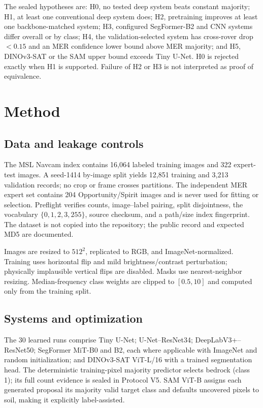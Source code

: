 \documentclass{article}
\begin{document}
The sealed hypotheses are: H0, no tested deep system beats constant majority; H1, at least one
conventional deep system does; H2, pretraining improves at least one backbone-matched system; H3,
configured SegFormer-B2 and CNN systems differ overall or by class; H4, the validation-selected
system has cross-rover drop $<0.15$ and an MER confidence lower bound above MER majority; and H5,
DINOv3-SAT or the SAM upper bound exceeds Tiny U-Net. H0 is rejected exactly when H1 is supported.
Failure of H2 or H3 is not interpreted as proof of equivalence.

\section{Method}

\subsection{Data and leakage controls}

The MSL Navcam index contains 16,064 labeled training images and 322 expert-test images. A
seed-1414 by-image split yields 12,851 training and 3,213 validation records; no crop or frame
crosses partitions. The independent MER expert set contains 204 Opportunity/Spirit images and is
never used for fitting or selection. Preflight verifies counts, image--label pairing, split
disjointness, the vocabulary $\{0,1,2,3,255\}$, source checksum, and a path/size index fingerprint.
The dataset is not copied into the repository; the public record and expected MD5 are documented.

Images are resized to $512^2$, replicated to RGB, and ImageNet-normalized. Training uses
horizontal flip and mild brightness/contrast perturbation; physically implausible vertical flips
are disabled. Masks use nearest-neighbor resizing. Median-frequency class weights are clipped to
$[0.5,10]$ and computed only from the training split.

\subsection{Systems and optimization}

The 30 learned runs comprise Tiny U-Net; U-Net--ResNet34; DeepLabV3+--ResNet50; SegFormer MiT-B0
and B2, each where applicable with ImageNet and random initialization; and DINOv3-SAT ViT-L/16
with a trained segmentation head. The deterministic training-pixel majority predictor selects
bedrock (class 1); its full count evidence is sealed in Protocol V5. SAM ViT-B assigns each
generated proposal its majority valid target class and defaults uncovered pixels to soil, making
it explicitly label-assisted.
\end{document}

